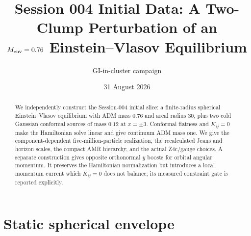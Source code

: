 \documentclass[11pt]{article}
\title{Session 004 Initial Data: A Two-Clump Perturbation of an\\
       $M_{\rm env}=0.76$ Einstein--Vlasov Equilibrium}
\author{GI-in-cluster campaign}
\date{31 August 2026}
\begin{document}
\maketitle

\begin{abstract}
We independently construct the Session-004 initial slice: a finite-radius spherical
Einstein--Vlasov equilibrium with ADM mass $0.76$ and areal radius $30$, plus two cold
Gaussian conformal sources of mass $0.12$ at $x=\pm3$.  Conformal flatness and
$K_{ij}=0$ make the Hamiltonian solve linear and give continuum ADM mass one.  We give
the component-dependent five-million-particle realization, the recalculated Jeans and
horizon scales, the compact AMR hierarchy, and the actual Z4c/gauge choices.  A separate
construction gives opposite orthonormal $y$ boosts for orbital angular momentum.  It
preserves the Hamiltonian normalization but introduces a local momentum current which
$K_{ij}=0$ does not balance; its measured constraint gate is reported explicitly.
\end{abstract}

\section{Static spherical envelope}
\end{document}
